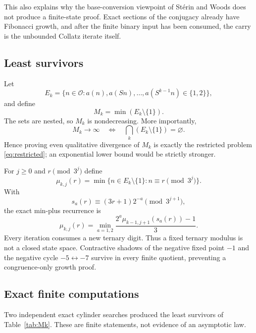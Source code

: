 \documentclass[11pt,reqno]{amsart}
\theoremstyle{plain}
\theoremstyle{definition}
\numberwithin{equation}{section}
\newcommand{\Odd}{\mathcal{O}}
\begin{document}
This also explains why the base-conversion viewpoint of St\'erin and Woods
\cite{sterinwoods2020} does not produce a finite-state proof.  Exact sections
of the conjugacy already have Fibonacci growth, and after the finite binary
input has been consumed, the carry is the unbounded Collatz iterate itself.

\subsection{Least survivors}

Let
\[
E_k=\{n\in\Odd:
a(n),a(Sn),\ldots,a(S^{k-1}n)\in\{1,2\}\},
\]
and define
\[
M_k=\min(E_k\setminus\{1\}).
\]
The sets are nested, so $M_k$ is nondecreasing.  More importantly,
\begin{equation}\label{eq:survivordiv}
M_k\to\infty
\quad\Longleftrightarrow\quad
\bigcap_k(E_k\setminus\{1\})=\varnothing.
\end{equation}
Hence proving even qualitative divergence of $M_k$ is exactly the restricted
problem \eqref{eq:restricted}; an exponential lower bound would be strictly
stronger.

For $j\ge0$ and $r\pmod{3^j}$ define
\[
\mu_{k,j}(r)=
\min\{n\in E_k\setminus\{1\}:n\equiv r\pmod{3^j}\}.
\]
With
\[
s_a(r)\equiv(3r+1)2^{-a}\pmod{3^{j+1}},
\]
the exact min-plus recurrence is
\begin{equation}\label{eq:minplus}
\mu_{k,j}(r)=
\min_{a=1,2}
\frac{2^a\mu_{k-1,j+1}(s_a(r))-1}{3}.
\end{equation}
Every iteration consumes a new ternary digit.  Thus a fixed ternary modulus is
not a closed state space.  Contractive shadows of the negative fixed point
$-1$ and the negative cycle $-5\leftrightarrow-7$ survive in every finite
quotient, preventing a congruence-only growth proof.

\subsection{Exact finite computations}

Two independent exact cylinder searches produced the least survivors of
Table~\ref{tab:Mk}.  These are finite statements, not evidence of an
asymptotic law.
\end{document}

